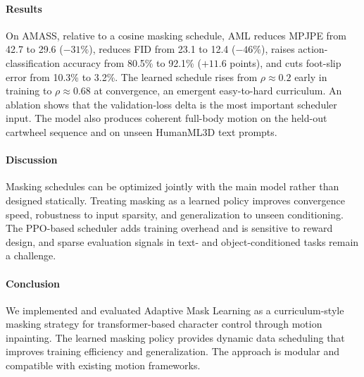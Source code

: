 \documentclass[10pt,letterpaper]{article}
\begin{document}
\paragraph{Results}
On AMASS, relative to a cosine masking schedule, AML reduces MPJPE from 42.7 to 29.6 ($-31\%$), reduces FID from 23.1 to 12.4 ($-46\%$), raises action-classification accuracy from 80.5\% to 92.1\% ($+11.6$ points), and cuts foot-slip error from 10.3\% to 3.2\%. The learned schedule rises from $\rho \approx 0.2$ early in training to $\rho \approx 0.68$ at convergence, an emergent easy-to-hard curriculum. An ablation shows that the validation-loss delta is the most important scheduler input. The model also produces coherent full-body motion on the held-out cartwheel sequence and on unseen HumanML3D text prompts.

\paragraph{Discussion}
Masking schedules can be optimized jointly with the main model rather than designed statically. Treating masking as a learned policy improves convergence speed, robustness to input sparsity, and generalization to unseen conditioning. The PPO-based scheduler adds training overhead and is sensitive to reward design, and sparse evaluation signals in text- and object-conditioned tasks remain a challenge.

\paragraph{Conclusion}
We implemented and evaluated Adaptive Mask Learning as a curriculum-style masking strategy for transformer-based character control through motion inpainting. The learned masking policy provides dynamic data scheduling that improves training efficiency and generalization. The approach is modular and compatible with existing motion frameworks.

\newpage
\maketitle
\thispagestyle{fancy}
\end{document}

